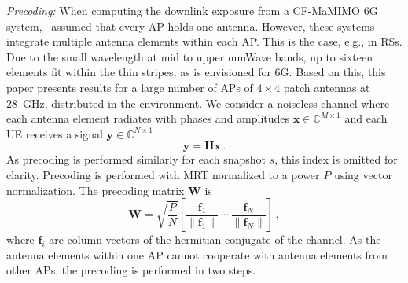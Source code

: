 \documentclass{IEEEtran}
\begin{document}
\textit{Precoding:} When computing the downlink exposure from a \gls{CF-MaMIMO} \gls{6G} system,~\cite{QD/FDTD} assumed that every \gls{AP} holds one antenna. However, these systems integrate multiple antenna elements within each \gls{AP}. This is the case, e.g., in \glspl{RS}. Due to the small wavelength at mid to upper mmWave bands, up to sixteen elements fit within the thin stripes, as is envisioned for \gls{6G}. Based on this, this paper presents results for a large number of \glspl{AP} of $4\times 4$ patch antennas at 28~GHz, distributed in the environment. 
We consider a noiseless channel where each antenna element radiates with phases and amplitudes $\boldsymbol{x} \in \mathbb{C}^{M\times 1}$ and each \gls{UE} receives a signal $\boldsymbol{y} \in \mathbb{C}^{N\times 1}$
\begin{equation}
\label{eq:y_Hx}
    \boldsymbol{y} = \mathbf{H}\boldsymbol{x} \, .
\end{equation}
As precoding is performed similarly for each snapshot $s$, this index is omitted for clarity. Precoding is performed with \gls{MRT} normalized to a power $P$ using vector normalization. The precoding matrix $\mathbf{W}$ is~\cite{vectornorm}
\begin{equation}
\label{eq:precoding_defintion}
\mathbf{W} = \sqrt{\frac{P}{N}} \left[ \frac{\mathbf{f}_1}{\|\mathbf{f}_1\|} \, \cdots \, \frac{\mathbf{f}_N}{\|\mathbf{f}_N\|}\right] \, ,
\end{equation}
where $\mathbf{f}_i$ are column vectors of the hermitian conjugate of the channel. As the antenna elements within one \gls{AP} cannot cooperate with antenna elements from other \glspl{AP}, the precoding is performed in two steps. 
\end{document}
